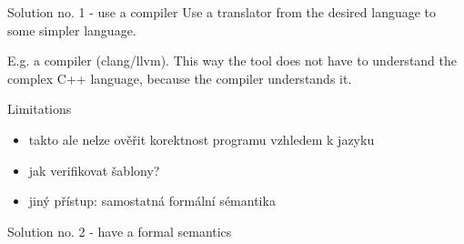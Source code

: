 \documentclass[11pt]{beamer}
\begin{document}

\begin{frame}{Solution no. 1 - use a compiler}
Use a translator from the desired language to some simpler language.

E.g. a compiler (clang/llvm). This way the tool does not have to understand the complex C++ language, because the compiler understands it.

\end{frame}





\begin{frame}{Limitations}

\begin{itemize}
\pause \item takto ale nelze ověřit korektnost programu vzhledem k jazyku
\pause \item jak verifikovat šablony?
\pause \item jiný přístup: samostatná formální sémantika
\end{itemize}


\end{frame}


\begin{frame}{Solution no. 2 - have a formal semantics}

\end{frame}


% 
\end{document}
